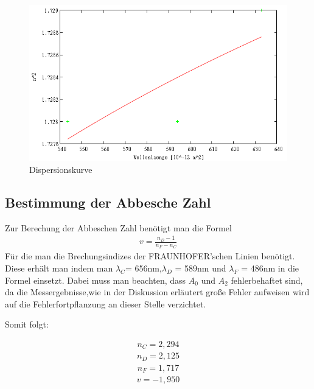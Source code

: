 \begin{figure}[h]
	\centering
		\includegraphics[width=1.00\textwidth]{Plot1B.png}
		\caption{Dispersionskurve}
	\label{fig:Plot}
\end{figure}

\subsection{Bestimmung der Abbesche Zahl}
Zur Berechung der Abbeschen Zahl benötigt man die Formel
\begin{align}
v=\frac{n_D-1}{n_F-n_C}\nonumber
\end{align}
Für die man die Brechungsindizes der FRAUNHOFER'schen Linien benötigt. Diese erhält man
indem man $\lambda_C$= 656nm,$\lambda_D$ = 589nm und $\lambda_F$ = 486nm in die Formel einsetzt.
Dabei muss man beachten, dass $A_0$ und $A_2$ fehlerbehaftet sind, da die Messergebnisse,wie in der Diskussion
erläutert große Fehler aufweisen wird auf die Fehlerfortpflanzung an dieser Stelle verzichtet.

Somit folgt:

\begin{align}
n_C= 2,294\nonumber
\end{align}
\begin{align}
n_D= 2,125\nonumber
\end{align}
\begin{align}
n_F= 1,717\nonumber
\end{align}
\begin{align}
v= -1,950 \nonumber
\end{align}




